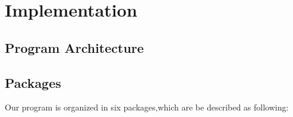 \documentclass{report}
\begin{document}
\chapter{Implementation}

\section*{Program Architecture}

\section{Packages}

Our program is organized in six packages,which are be described as following:\\
\end{document}
